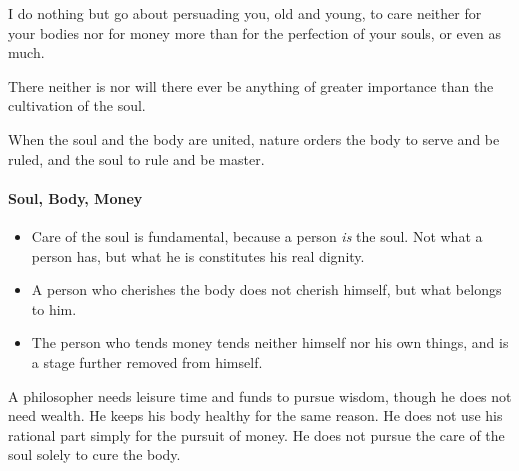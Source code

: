 \begin{quotex}
I do nothing but go about persuading you, old and young, to care neither for your bodies nor for money more than for the perfection of your souls, or even as much. 

There neither is nor will there ever be anything of greater importance than the cultivation of the soul. 

When the soul and the body are united, nature orders the body to serve and be ruled, and the soul to rule and be master. 

\end{quotex}
\paragraph{Soul, Body, Money}
\begin{itemize}
\item Care of the soul is fundamental, because a person \emph{is} the soul. Not what a person has, but what he is constitutes his real dignity. 
\item A person who cherishes the body does not cherish himself, but what belongs to him. 
\item The person who tends money tends neither himself nor his own things, and is a stage further removed from himself. 
\end{itemize}
A philosopher needs leisure time and funds to pursue wisdom, though he does not need wealth. He keeps his body healthy for the same reason. He does not use his rational part simply for the pursuit of money. He does not pursue the care of the soul solely to cure the body.

